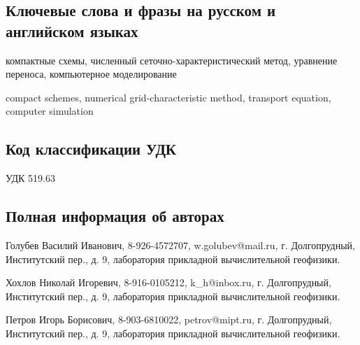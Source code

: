 \documentclass[11pt]{article}
\begin{document}
\subsection {Ключевые слова и фразы на русском и английском языках}

компактные схемы, численный сеточно-характеристический метод, уравнение переноса, компьютерное моделирование

compact schemes, numerical grid-characteristic method, transport equation, computer simulation

\subsection {Код классификации УДК}

УДК 519.63

\subsection {Полная информация об авторах}

Голубев Василий Иванович, 8-926-4572707, w.golubev@mail.ru, г. Долгопрудный, Институтский пер., д. 9, лаборатория прикладной вычислительной геофизики.

Хохлов Николай Игоревич, 8-916-0105212, k\_h@inbox.ru, г. Долгопрудный, Институтский пер., д. 9, лаборатория прикладной вычислительной геофизики.

Петров Игорь Борисович, 8-903-6810022, petrov@mipt.ru, г. Долгопрудный, Институтский пер., д. 9, лаборатория прикладной вычислительной геофизики.

\fi
\end{document}
